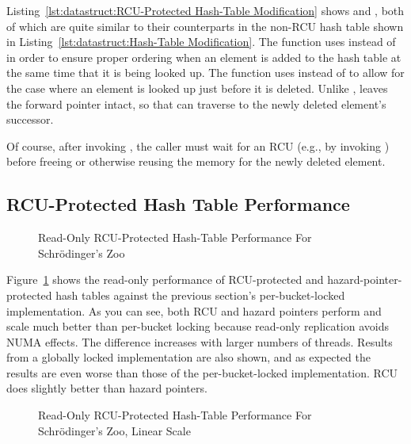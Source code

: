 Listing~\ref{lst:datastruct:RCU-Protected Hash-Table Modification}
shows  and , both of which
are quite similar to their counterparts in the non-RCU hash table
shown in
Listing~\ref{lst:datastruct:Hash-Table Modification}.
The  function uses  instead
of  in order to ensure proper ordering when
an element is added to the hash table at the same time that it is
being looked up.
The  function uses  instead
of  to allow for the case where an element is
looked up just before it is deleted.
Unlike ,  leaves the
forward pointer intact, so that  can traverse
to the newly deleted element's successor.

Of course, after invoking , the caller must wait for
an RCU  (e.g., by invoking ) before
freeing or otherwise reusing the memory for the newly deleted element.

\subsection{RCU-Protected Hash Table Performance}
\label{sec:datastruct:RCU-Protected Hash Table Performance}

\begin{figure}
\centering
{}
\caption{Read-Only RCU-Protected Hash-Table Performance For Schr\"odinger's Zoo}
\label{fig:datastruct:Read-Only RCU-Protected Hash-Table Performance For Schroedinger's Zoo}
\end{figure}

Figure~\ref{fig:datastruct:Read-Only RCU-Protected Hash-Table Performance For Schroedinger's Zoo}
shows the read-only performance of RCU-protected and hazard-pointer-protected
hash tables against the previous section's per-bucket-locked implementation.
As you can see, both RCU and hazard pointers perform and scale
much better than per-bucket locking because read-only
replication avoids NUMA effects.
The difference increases with larger numbers of threads.
Results from a globally locked implementation are also shown, and as expected
the results are even worse than those of the per-bucket-locked implementation.
RCU does slightly better than hazard pointers.

\begin{figure}
\centering
{}
\caption{Read-Only RCU-Protected Hash-Table Performance For Schr\"odinger's Zoo, Linear Scale}
\label{fig:datastruct:Read-Only RCU-Protected Hash-Table Performance For Schroedinger's Zoo; Linear Scale}
\end{figure}

